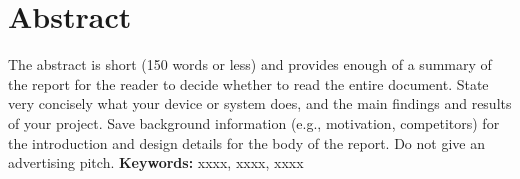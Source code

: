 \documentclass[../individual_thesis.tex]{subfiles}
\begin{document}
\chapter*{Abstract}
The abstract is short (150 words or less) and provides enough of a summary of the report for the reader to decide whether to read the entire document. State very concisely what your device or system does, and the main findings and results of your project. Save background information (e.g., motivation, competitors) for the introduction and design details for the body of the report. Do not give an advertising pitch.
\newline\noindent\textbf{Keywords:} xxxx, xxxx, xxxx
\end{document}
